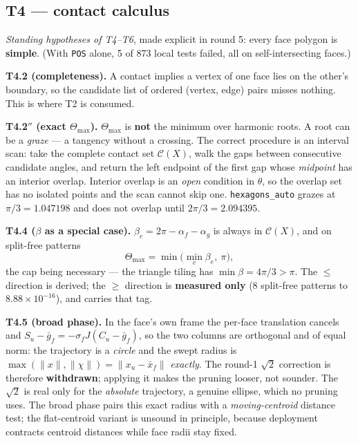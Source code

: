 \documentclass[10pt,a4paper]{article}
\newcommand{\fn}[1]{\nolinkurl{#1}}
\begin{document}
\subsection{T4 --- contact calculus}

\emph{Standing hypotheses of T4--T6}, made explicit in round 5: every face polygon is
\textbf{simple}. (With \texttt{POS} alone, 5 of 873 local tests failed, all on self-intersecting
faces.)

\textbf{T4.2 (completeness).} A contact implies a vertex of one face lies on the other's
boundary, so the candidate list of ordered (vertex, edge) pairs misses nothing. This is where
T2 is consumed.

\textbf{T4.2$''$ (exact $\Theta_{\max}$).} $\Theta_{\max}$ is \textbf{not} the minimum over
harmonic roots. A root can be a \emph{graze} --- a tangency without a crossing. The correct
procedure is an interval scan: take the complete contact set $\mathcal C(X)$, walk the gaps
between consecutive candidate angles, and return the left endpoint of the first gap whose
\emph{midpoint} has an interior overlap. Interior overlap is an \emph{open} condition in
$\theta$, so the overlap set has no isolated points and the scan cannot skip one.
\fn{hexagons_auto} grazes at $\pi/3 = 1.047198$ and does not overlap until
$2\pi/3 = 2.094395$.

\textbf{T4.4 ($\beta$ as a special case).} $\beta_e = 2\pi - \alpha_f - \alpha_g$ is always in
$\mathcal C(X)$, and on split-free patterns
\[
\Theta_{\max} = \min\big(\min_e \beta_e,\ \pi\big),
\]
the cap being necessary --- the triangle tiling has $\min\beta = 4\pi/3 > \pi$. The $\le$
direction is derived; the $\ge$ direction is \textbf{measured only} (8 split-free patterns to
$8.88\times10^{-16}$), and carries that tag.

\textbf{T4.5 (broad phase).} In the face's own frame the per-face translation cancels and
$S_u - \bar g_f = -\sigma_f J(C_u - \bar g_f)$, so the two columns are orthogonal and of equal
norm: the trajectory is a \emph{circle} and the swept radius is
$\max(\|x\|,\|\chi\|) = \|x_u - \bar x_f\| $ \emph{exactly}. The round-1 $\sqrt2$ correction is
therefore \textbf{withdrawn}; applying it makes the pruning looser, not sounder. The $\sqrt2$
is real only for the \emph{absolute} trajectory, a genuine ellipse, which no pruning uses. The
broad phase pairs this exact radius with a \emph{moving-centroid} distance test; the
flat-centroid variant is unsound in principle, because deployment contracts centroid distances
while face radii stay fixed.
\end{document}
